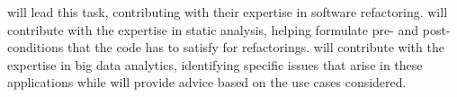 \begin{Workpackage}{\thewpno}
\begin{Task}
\SAshort{} will lead this task, contributing with their expertise in software refactoring. \YAGshort{} will contribute with the expertise in static analysis, helping formulate pre- and post-conditions that the code has to satisfy for refactorings. \UODshort{} will contribute with the expertise in big data analytics, identifying specific issues that arise in these applications while \SOPRAshort{} will provide advice based on the use cases considered.

\end{Task}



%
%
%



\end{Workpackage}
